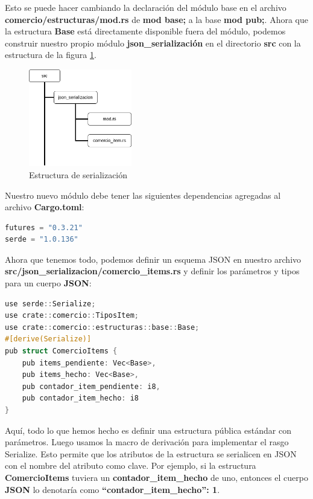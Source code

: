 Esto se puede hacer cambiando la declaración del módulo base en el archivo \textbf{comercio/estructuras/mod.rs} de \textbf{mod base;} a la base \textbf{mod pub;}. Ahora que la estructura \textbf{Base} está directamente disponible fuera del módulo, podemos construir nuestro propio módulo \textbf{json\_serialización} en el directorio \textbf{src} con la estructura de la figura \ref{cap3:005}.

\begin{figure}[htb]
	\centering
	\includegraphics[width=0.4\textwidth]{capitulo3/serializacion.png}
	\caption{Estructura de serialización}
	\label{cap3:005}
\end{figure}


Nuestro nuevo módulo debe tener las siguientes dependencias agregadas al archivo \textbf{Cargo.toml}:

\begin{lstlisting}[language=C]
futures = "0.3.21"
serde = "1.0.136"
\end{lstlisting}

Ahora que tenemos todo, podemos definir un esquema JSON en nuestro archivo \textbf{src/json\_serializacion/comercio\_items.rs} y definir los parámetros y tipos para un cuerpo \textbf{JSON}:

\begin{lstlisting}[language=C]
use serde::Serialize;
use crate::comercio::TiposItem;
use crate::comercio::estructuras::base::Base;
#[derive(Serialize)]
pub struct ComercioItems {
	pub items_pendiente: Vec<Base>,
	pub items_hecho: Vec<Base>,
	pub contador_item_pendiente: i8,
	pub contador_item_hecho: i8
}
\end{lstlisting}

Aquí, todo lo que hemos hecho es definir una estructura pública estándar con parámetros. Luego usamos la macro de derivación para implementar el rasgo Serialize. Esto permite que los atributos de la estructura se serialicen en JSON con el nombre del atributo como clave. Por ejemplo, si la estructura \textbf{ComercioItems} tuviera un \textbf{contador\_item\_hecho} de uno, entonces el cuerpo \textbf{JSON} lo denotaría como \textbf{``contador\_item\_hecho'': 1}.

